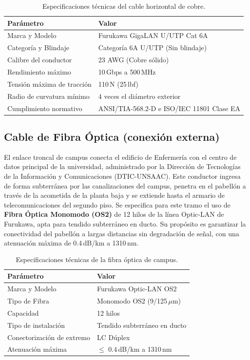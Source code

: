 \begin{table}[H]
\centering
\caption{Especificaciones técnicas del cable horizontal de cobre.}
\label{tab:spec_cable_cobre}
\begin{tabular}{lp{9cm}}
\hline
\textbf{Parámetro} & \textbf{Valor} \\
\hline
Marca y Modelo & Furukawa GigaLAN U/UTP Cat 6A \\
Categoría y Blindaje & Categoría 6A U/UTP (Sin blindaje) \\
Calibre del conductor & 23 AWG (Cobre sólido) \\
Rendimiento máximo & 10\,Gbps a 500\,MHz \\
Tensión máxima de tracción & 110\,N (25\,lbf) \\
Radio de curvatura mínimo & 4 veces el diámetro exterior \\
Cumplimiento normativo & ANSI/TIA-568.2-D e ISO/IEC 11801 Clase EA \\
\hline
\end{tabular}
\end{table}

\subsection{Cable de Fibra Óptica (conexión externa)}
El enlace troncal de campus conecta el edificio de Enfermería con el centro de datos principal de la universidad, administrado por la Dirección de Tecnologías de la Información y Comunicaciones (DTIC-UNSAAC).
Este conductor ingresa de forma subterránea por las canalizaciones del campus, penetra en el pabellón a través de la acometida de la planta baja y se extiende hasta el armario de telecomunicaciones del segundo piso.
Se especifica para este tramo el uso de \textbf{Fibra Óptica Monomodo (OS2)} de 12 hilos de la línea Optic-LAN de Furukawa, apta para tendido subterráneo en ducto.
Su propósito es garantizar la conectividad del pabellón a largas distancias sin degradación de señal, con una atenuación máxima de 0.4\,dB/km a 1310\,nm.

\begin{table}[H]
\centering
\caption{Especificaciones técnicas de la fibra óptica de campus.}
\label{tab:spec_fibra}
\begin{tabular}{lp{9cm}}
\hline
\textbf{Parámetro} & \textbf{Valor} \\
\hline
Marca y Modelo & Furukawa Optic-LAN OS2 \\
Tipo de Fibra & Monomodo OS2 (9/125\,$\mu$m) \\
Capacidad & 12 hilos \\
Tipo de instalación & Tendido subterráneo en ducto \\
Conectorización de extremo & LC Dúplex \\
Atenuación máxima & $\le$ 0.4\,dB/km a 1310\,nm \\
\hline
\end{tabular}
\end{table}

